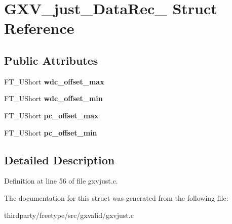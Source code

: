 \hypertarget{struct_g_x_v__just___data_rec__}{}\section{G\+X\+V\+\_\+just\+\_\+\+Data\+Rec\+\_\+ Struct Reference}
\label{struct_g_x_v__just___data_rec__}
\subsection*{Public Attributes}
\begin{DoxyCompactItemize}
\item 
\mbox{\label{struct_g_x_v__just___data_rec___a3bb776ce742cc332e8df6b818ddfd085}} 
F\+T\+\_\+\+U\+Short {\bfseries wdc\+\_\+offset\+\_\+max}
\item 
\mbox{\label{struct_g_x_v__just___data_rec___a03447cf691a111f170baf2e5f911442b}} 
F\+T\+\_\+\+U\+Short {\bfseries wdc\+\_\+offset\+\_\+min}
\item 
\mbox{\label{struct_g_x_v__just___data_rec___a94f5d44d7b645e735b4987047fae52c6}} 
F\+T\+\_\+\+U\+Short {\bfseries pc\+\_\+offset\+\_\+max}
\item 
\mbox{\label{struct_g_x_v__just___data_rec___a9fc2cb8c94ec3ede57cd2bb4c69fb2fd}} 
F\+T\+\_\+\+U\+Short {\bfseries pc\+\_\+offset\+\_\+min}
\end{DoxyCompactItemize}


\subsection{Detailed Description}


Definition at line 56 of file gxvjust.\+c.



The documentation for this struct was generated from the following file\+:\begin{DoxyCompactItemize}
\item 
thirdparty/freetype/src/gxvalid/gxvjust.\+c\end{DoxyCompactItemize}
